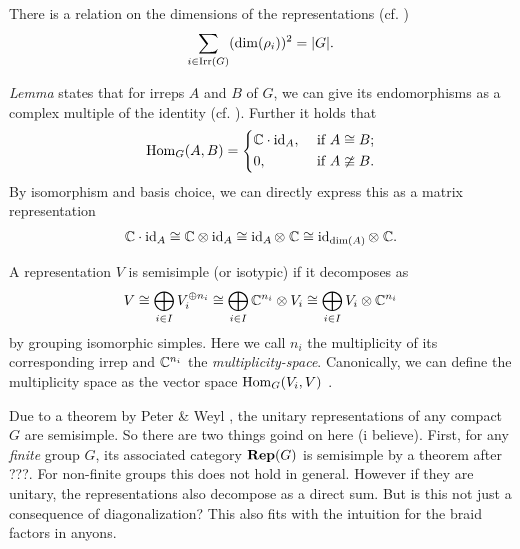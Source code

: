 \begin{theorem}
  There is a relation on the dimensions of the representations (cf. \cite[~Thm
  3.1 (ii)]{etingofIntroductionRepresentationTheory2011})
  \[
    \sum_{i \in \mathrm{Irr}(G)} (\dim(\rho_i))^2 = |G|.
  \]
\end{theorem}

\begin{lemma}
  \label{sym:lemma:schur}
  \emph{ Lemma} states that for irreps $A$ and $B$ of $G$, we can
  give its endomorphisms as a complex multiple of the identity (cf. ). Further
  it holds that
  \begin{equation}\label{sym:eq:schur} 
    \operatorname{Hom}_G(A,B) = \begin{dcases}
      \mathbb{C} \cdot \operatorname{id}_A, &\text{ if } A \cong B ;\\
      0 , &\text{ if } A \ncong B .
    \end{dcases}
  \end{equation}
  By isomorphism and basis choice, we can directly express this as a matrix
  representation
  \[
    \mathbb{C} \cdot \operatorname{id}_A \cong \mathbb{C} \otimes \operatorname{id}_A \cong \operatorname{id}_A \otimes\; \mathbb{C} \cong \operatorname{id}_{\dim(A)} \otimes\; \mathbb{C}.
  \]
\end{lemma}

\begin{definition}\label{sym:def:isotypic} A
  representation $V$ is semisimple (or isotypic) if it decomposes as
  \[
    V \cong \bigoplus_{i \in I} V_i^{\oplus n_i} 
    \cong 
    \bigoplus_{i \in I} \mathbb{C}^{n_i} \otimes V_i
    \cong
    \bigoplus_{i \in I} V_i \otimes \mathbb{C}^{n_i}
  \]
  by grouping isomorphic simples. Here we call $n_i$ the multiplicity of its
  corresponding irrep and $\mathbb{C}^{n_i}$ the \emph{multiplicity-space}. Canonically,
  we can define the multiplicity space as the vector space $\operatorname{Hom}_G(V_i, V)$
  \cite[~Cor. 2.16]{fultonRepresentationTheory2004}.
\end{definition}

Due to a theorem by Peter \& Weyl \cite{}, the unitary representations of any
compact $G$ are semisimple. 
\color{red}
So there are two things goind on here (i believe). First, for any \emph{finite}
group $G$, its associated category $\mathbf{Rep}(G)$ is semisimple by a theorem after
???. For non-finite groups this does not hold in general. However if they are
unitary, the representations also decompose as a direct sum. But is this not
just a consequence of diagonalization? This also fits with the intuition for the
braid factors in anyons.
\color{black}

